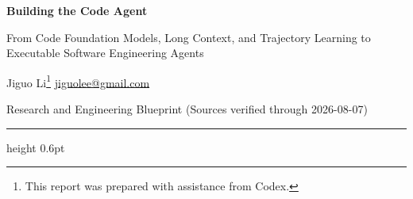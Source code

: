 \documentclass[10pt,a4paper,UTF8,fontset=none]{ctexart}
\def\BilingualTocExtension{entoc}
\newcommand{\BilingualUseEnglishToc}{\gdef\BilingualTocExtension{entoc}}
\def\BilingualAnchorPrefix{en}
\begin{document}
\renewcommand{\contentsname}{Contents}
\renewcommand{\figurename}{Figure}
\renewcommand{\tablename}{Table}
\renewcommand{\refname}{References}
\renewcommand{\appendixname}{Appendix}
\BilingualUseEnglishToc
{}
\renewcommand*{\theHsection}{en.\arabic{section}}
\renewcommand*{\theHsubsection}{en.\arabic{section}.\arabic{subsection}}
\renewcommand*{\theHsubsubsection}{en.\arabic{section}.\arabic{subsection}.\arabic{subsubsection}}
\renewcommand*{\theHequation}{en.\arabic{equation}}
\renewcommand*{\theHfigure}{en.\arabic{figure}}
\renewcommand*{\theHtable}{en.\arabic{table}}
\gdef\BilingualAnchorPrefix{en}
\markboth{}{}
\renewcommand{\contentsname}{Contents}
\renewcommand{\figurename}{Figure}
\renewcommand{\tablename}{Table}
\renewcommand{\refname}{References}
\renewcommand{\appendixname}{Appendix}
\markboth{}{}

\begin{center}
  {\bfseries\color{Navy} Building the Code Agent\par}
  \vspace{4pt}
  {\color{Navy} From Code Foundation Models, Long Context, and Trajectory Learning to Executable Software Engineering Agents\par}
  \vspace{6pt}
  {\small Jiguo Li\footnote{{This report was prepared with assistance from Codex.}}\quad
  \href{mailto:jiguolee@gmail.com}{jiguolee@gmail.com}\par}
  \vspace{4pt}
  {\small Research and Engineering Blueprint (Sources verified through 2026-08-07)\par}
\end{center}

\vspace{6pt}
{\color{Navy}\hrule height 0.6pt}
\vspace{8pt}
\end{document}
